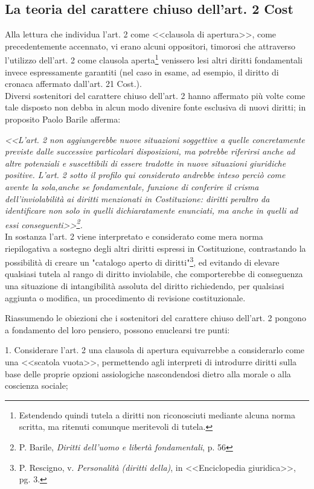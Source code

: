 \subsection{La teoria del carattere chiuso dell'art. 2 Cost}
Alla lettura che individua l'art. 2 come <<clausola di apertura>>, come precedentemente accennato, vi erano alcuni oppositori, timorosi che attraverso l'utilizzo dell’art. 2 come clausola aperta\footnote{Estendendo quindi tutela a diritti non riconosciuti mediante alcuna norma scritta, ma ritenuti comunque meritevoli di tutela.} venissero lesi altri diritti fondamentali invece espressamente garantiti (nel caso in esame, ad esempio, il diritto di cronaca affermato dall'art. 21 Cost.).
\\Diversi sostenitori del carattere chiuso dell'art. 2 hanno affermato più volte come tale disposto non debba in alcun modo divenire fonte esclusiva di nuovi diritti; in proposito Paolo Barile afferma: 

\textit{<<L’art. 2 non aggiungerebbe nuove situazioni soggettive a quelle concretamente previste dalle successive particolari disposizioni, ma potrebbe riferirsi anche ad altre potenziali e suscettibili di essere tradotte in nuove situazioni giuridiche positive. L’art. 2 sotto il profilo qui considerato andrebbe inteso perciò come avente la sola,anche se fondamentale, funzione di conferire il crisma dell’inviolabilità ai diritti menzionati in Costituzione: diritti peraltro da identificare non solo in quelli dichiaratamente enunciati, ma anche in quelli ad essi conseguenti>>\footnote{P. Barile, \textit{Diritti dell’uomo e libertà fondamentali}, p. 56}.} 
\\In sostanza l'art. 2 viene interpretato e considerato come mera norma riepilogativa a sostegno degli altri diritti espressi in Costituzione, contrastando la possibilità di creare un "catalogo aperto di diritti"\footnote{P. Rescigno, v. \textit{Personalità (diritti della)}, in <<Enciclopedia giuridica>>, pg. 3.}, ed evitando di elevare qualsiasi tutela al rango di diritto inviolabile, che comporterebbe di conseguenza una situazione di intangibilità assoluta del diritto richiedendo, per qualsiasi aggiunta o modifica, un procedimento di revisione costituzionale.

Riassumendo le obiezioni che i sostenitori del carattere chiuso dell'art. 2 pongono a fondamento del loro pensiero, possono enuclearsi tre punti:

1. Considerare l'art. 2 una clausola di apertura equivarrebbe a considerarlo come una <<scatola vuota>>, permettendo agli interpreti di introdurre diritti sulla base delle proprie opzioni assiologiche nascondendosi dietro alla morale o alla coscienza sociale;

